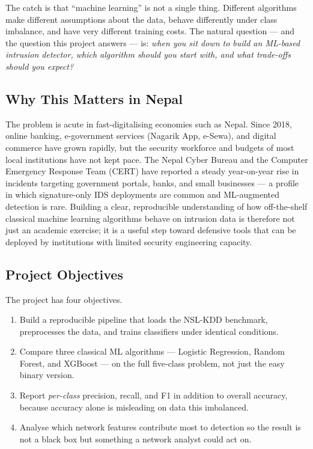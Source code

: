 \documentclass[11pt, a4paper]{article}
\begin{document}
The catch is that ``machine learning'' is not a single thing. Different algorithms make different assumptions about the data, behave differently under class imbalance, and have very different training costs. The natural question --- and the question this project answers --- is: \emph{when you sit down to build an ML-based intrusion detector, which algorithm should you start with, and what trade-offs should you expect?}

\subsection{Why This Matters in Nepal}
The problem is acute in fast-digitalising economies such as Nepal. Since 2018, online banking, e-government services (Nagarik App, e-Sewa), and digital commerce have grown rapidly, but the security workforce and budgets of most local institutions have not kept pace. The Nepal Cyber Bureau and the Computer Emergency Response Team (CERT) have reported a steady year-on-year rise in incidents targeting government portals, banks, and small businesses --- a profile in which signature-only IDS deployments are common and ML-augmented detection is rare. Building a clear, reproducible understanding of how off-the-shelf classical machine learning algorithms behave on intrusion data is therefore not just an academic exercise; it is a useful step toward defensive tools that can be deployed by institutions with limited security engineering capacity.

\subsection{Project Objectives}
The project has four objectives.

\begin{enumerate}
    \item Build a reproducible pipeline that loads the NSL-KDD benchmark, preprocesses the data, and trains classifiers under identical conditions.
    \item Compare three classical ML algorithms --- Logistic Regression, Random Forest, and XGBoost --- on the full five-class problem, not just the easy binary version.
    \item Report \emph{per-class} precision, recall, and F1 in addition to overall accuracy, because accuracy alone is misleading on data this imbalanced.
    \item Analyse which network features contribute most to detection so the result is not a black box but something a network analyst could act on.
\end{enumerate}
\end{document}
